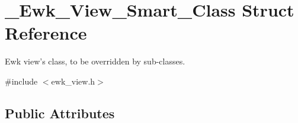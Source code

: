 \hypertarget{struct__Ewk__View__Smart__Class}{\section{\+\_\+\+Ewk\+\_\+\+View\+\_\+\+Smart\+\_\+\+Class Struct Reference}
\label{struct__Ewk__View__Smart__Class}
}


Ewk view's class, to be overridden by sub-\/classes.  




{\ttfamily \#include $<$ewk\+\_\+view.\+h$>$}

\subsection*{Public Attributes}
